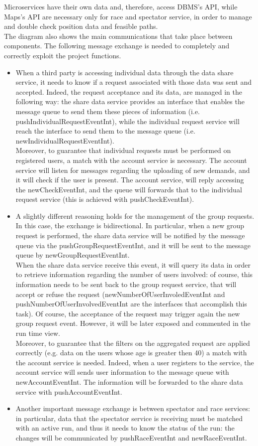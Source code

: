 Microservices have their own data and, therefore, access DBMS's API, while Maps's API are necessary 
only for race and spectator service, in order to manage and double check position data and feasible paths. \\
The diagram also shows the main communications that take place between components. The following message exchange is needed to completely and
correctly exploit the project functions. 
\begin{itemize}
\item 
When a third party is accessing individual data through the data share service, it
needs to know if a request associated with those data was sent and accepted. 
Indeed, the request acceptance and its data, are managed in the following way: the share data service provides an interface that enables the
message queue to send them these pieces of information (i.e. pushIndividualRequestEventInt), while the individual request service will
reach the interface to send them to the message queue (i.e. newIndividualRequestEventInt). \\
Moreover, to guarantee that individual requests must be performed on registered users, a match with the account service is necessary. The 
account service will listen for messages regarding the uploading of new demands, and it will check if the user is present. 
The account service, will reply accessing the newCheckEventInt, and the queue will forwards that to the individual request service (this is achieved with pushCheckEventInt).
\item 
A slightly different reasoning holds for the management of the group requests. In this case, the exchange is bidirectional. 
In particular, when a new group request is performed, the share data service will be notified by the message queue via the
pushGroupRequestEventInt, and it will be sent to the message queue by newGroupRequestEventInt. \\
When the share data service receive this event, it will query its data in order to retrieve information regarding the number of users
involved: of course, this information needs to be sent back to the group request service, that will accept or refuse the request
(newNumberOfUserInvoledEventInt and pushNumberOfUserInvolvedEventInt are the interfaces that accomplish this task). 
Of course, the acceptance of the request may trigger again the new group request event. 
However, it will be later exposed and commented in the run time view. \\
Moreover, to guarantee that the filters on the aggregated request are applied correctly (e.g. data on the users whose age is greater then 40)
a match with the account service is needed. 
Indeed, when a user registers to the service, the account service will sends user information to the message queue with newAccountEventInt. 
The information will be forwarded to the share data service with pushAccountEventInt.
\item
Another important message exchange is between spectator and race services: in particular, data that the spectator service is receiving must
be matched with an active run, and thus it needs to know the status of the run: the changes will be communicated by pushRaceEventInt and
newRaceEventInt.
\end{itemize}
